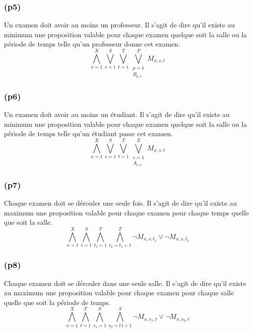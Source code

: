 \documentclass[a4paper,11pt]{article}
\begin{document}
\subsubsection{(p5)}
Un examen doit avoir au moins un professeur.
Il s'agit de dire qu'il existe au minimum une proposition valable pour chaque examen quelque soit la salle ou la période de temps telle qu'un professeur donne cet examen.
\begin{displaymath}
\bigwedge\limits_{x=1}^{X}\bigvee\limits_{s=1}^{S}\bigvee\limits_{t=1}^{T}\bigvee\limits_{\substack{p=1 \\ B_{p,x}}}^{P} M_{x, s, t}
\end{displaymath}

\subsubsection{(p6)}
Un examen doit avoir au moins un étudiant.
Il s'agit de dire qu'il existe au minimum une proposition valable pour chaque examen quelque soit la salle ou la période de temps telle qu'un étudiant passe cet examen.
\begin{displaymath}
\bigwedge\limits_{x=1}^{X}\bigvee\limits_{s=1}^{S}\bigvee\limits_{t=1}^{T}\bigvee\limits_{\substack{e=1 \\ A_{e,x}}}^{E} M_{x, s, t}
\end{displaymath}

\subsubsection{(p7)}
Chaque examen doit se dérouler une seule fois.
Il s'agit de dire qu'il existe au maximum une proposition valable pour chaque examen pour chaque temps quelle que soit la salle.
\begin{displaymath}
\bigwedge\limits_{x=1}^{X}\bigwedge\limits_{s=1}^{S}\bigwedge\limits_{t_{1}=1}^{T}\bigwedge\limits_{t_{2}=t_{1}+1}^{T} \neg M_{x, s, t_{1}} \vee \neg M_{x, s, t_{2}}
\end{displaymath}

\subsubsection{(p8)}
Chaque examen doit se dérouler dans une seule salle.
Il s'agit de dire qu'il existe au maximum une proposition valable pour chaque examen pour chaque salle quelle que soit la période de temps.
\begin{displaymath}
\bigwedge\limits_{x=1}^{X}\bigwedge\limits_{t=1}^{T}\bigwedge\limits_{s_{1}=1}^{S}\bigwedge\limits_{s_{2}=t1+1}^{S} \neg M_{x, s_{1}, t} \vee \neg M_{x, s_{2}, t}
\end{displaymath}
\end{document}
